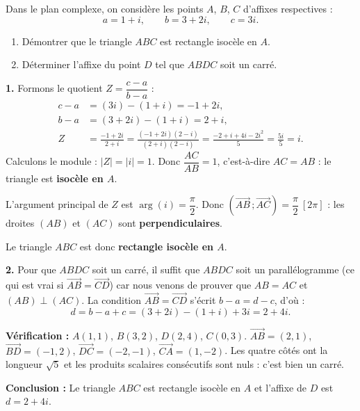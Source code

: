 \documentclass[11pt]{article}
\begin{document}
\begin{exoresolu}
Dans le plan complexe, on considère les points $A$, $B$, $C$ d'affixes respectives :
\[ a=1+i, \qquad b=3+2i, \qquad c=3i. \]
\begin{enumerate}
\item Démontrer que le triangle $ABC$ est rectangle isocèle en $A$.
\item Déterminer l'affixe du point $D$ tel que $ABDC$ soit un carré.
\end{enumerate}
\tcblower
\textbf{1.} Formons le quotient $Z=\dfrac{c-a}{b-a}$ :
\begin{align*}
c-a &= (3i)-(1+i)=-1+2i,\\
b-a &= (3+2i)-(1+i)=2+i,\\
Z &= \frac{-1+2i}{2+i}=\frac{(-1+2i)(2-i)}{(2+i)(2-i)}=\frac{-2+i+4i-2i^2}{5}=\frac{5i}{5}=i.
\end{align*}
Calculons le module : $|Z|=|i|=1$. Donc $\dfrac{AC}{AB}=1$, c'est-à-dire $AC=AB$ : le triangle est \textbf{isocèle en $A$}.

L'argument principal de $Z$ est $\arg(i)=\dfrac{\pi}{2}$. Donc $\left(\overrightarrow{AB}\,;\overrightarrow{AC}\right)=\dfrac{\pi}{2}\ [2\pi]$ : les droites $(AB)$ et $(AC)$ sont \textbf{perpendiculaires}.

Le triangle $ABC$ est donc \textbf{rectangle isocèle en $A$}.

\textbf{2.} Pour que $ABDC$ soit un carré, il suffit que $ABDC$ soit un parallélogramme (ce qui est vrai si $\overrightarrow{AB}=\overrightarrow{CD}$) car nous venons de prouver que $AB=AC$ et $(AB)\perp(AC)$.
La condition $\overrightarrow{AB}=\overrightarrow{CD}$ s'écrit $b-a = d-c$, d'où :
\[ d = b - a + c = (3+2i) - (1+i) + 3i = 2 + 4i. \]

\textbf{Vérification :} $A(1,1)$, $B(3,2)$, $D(2,4)$, $C(0,3)$. $\overrightarrow{AB}=(2,1)$, $\overrightarrow{BD}=(-1,2)$, $\overrightarrow{DC}=(-2,-1)$, $\overrightarrow{CA}=(1,-2)$. Les quatre côtés ont la longueur $\sqrt{5}$ et les produits scalaires consécutifs sont nuls : c'est bien un carré.

\textbf{Conclusion :} Le triangle $ABC$ est rectangle isocèle en $A$ et l'affixe de $D$ est $d=2+4i$.
\end{exoresolu}
\end{document}
